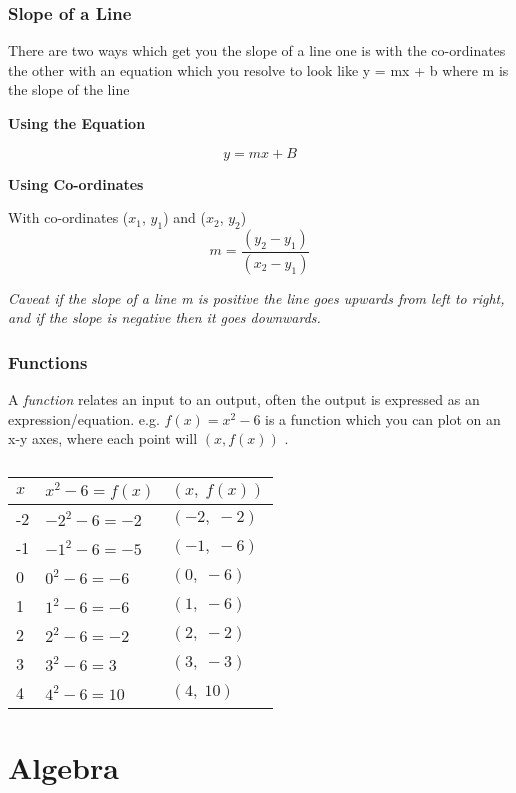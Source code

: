 \documentclass{article}
\begin{document}
\newpage
\subsubsection{Slope of a Line}
There are two ways which get you the slope of a line one is with the co-ordinates the other with an equation which you resolve to look like y = mx + b where m is the slope of the line

\textbf{Using the Equation}

\begin{equation}
y = mx + B
\end{equation}

\textbf{Using Co-ordinates}

With co-ordinates ($x_1$, $y_1$) and ($x_2$, $y_2$) 
\begin{equation}
m = \frac{ (y_2 - y_1) }{ (x_2 - y_1) }
\end{equation}


\textit{Caveat if the slope of a line m is positive the line goes upwards from left to right, and if the slope is negative then it goes downwards.}

\subsubsection{Functions}
A \textit{function} relates an input to an output, often the output is expressed as an expression/equation.
e.g. $f(x) = x^2 - 6 $ is a function which you can plot on an x-y axes, where each point will $(x,f(x))$ . 


\begin{table}
\begin{tabular}{l|l|l}
$x$ & $ x^{2} - 6 = f(x)$& $(x,\;f(x))$  \\
\hline
-2 & $-2^{2} -6 = -2$ & $(-2,\;-2)$  \\
-1 & $-1^{2} -6 = -5$ & $(-1,\;-6)$  \\
0 & $0^{2} -6 = -6$ & $(0,\;-6)$  \\
1 & $1^{2} -6 = -6$ & $(1,\;-6)$  \\
2 & $2^{2} -6 = -2$ & $(2,\;-2)$  \\
3 & $3^{2} -6 = 3$ & $(3,\;-3)$  \\
4 & $4^{2} -6 = 10$ & $(4,\;10)$ \\

\end{tabular}
\caption{\label{•}}
\end{table}

\newpage
\section{Algebra}
\end{document}
